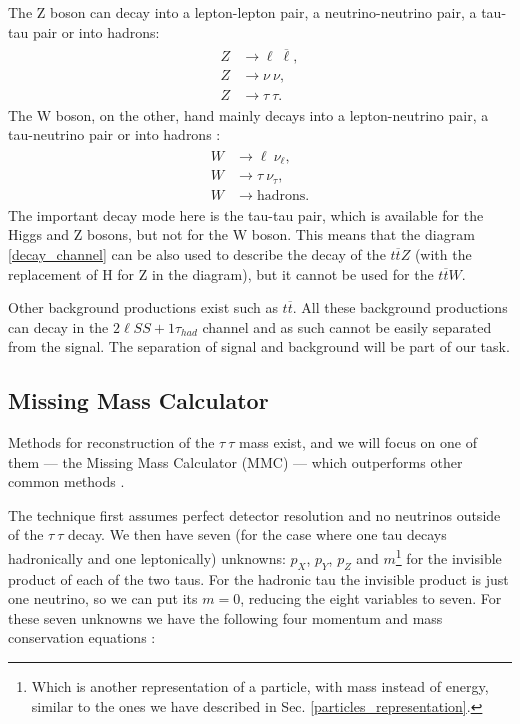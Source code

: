\documentclass{ctuthesis}
\begin{document}
The Z boson can decay into a lepton-lepton pair, a neutrino-neutrino pair, a tau-tau pair or into hadrons:
\begin{align}
\begin{split}
Z &\rightarrow \ell\: \overline{\ell}, \\
Z &\rightarrow \nu\: \nu, \\
Z &\rightarrow \tau\: \tau.
\end{split}
\end{align}
The W boson, on the other, hand mainly decays into a lepton-neutrino pair, a tau-neutrino pair or into hadrons \cite{W_Z_decay}:
\begin{align}
\begin{split}
W &\rightarrow \ell\: \nu_{\ell}, \\
W &\rightarrow \tau\: \nu_{\tau}, \\
W &\rightarrow \text{hadrons}.
\end{split}
\end{align}
The important decay mode here is the tau-tau pair, which is available for the Higgs and Z bosons, but not for the W boson. This means that the diagram \ref{decay_channel} can be also used to describe the decay of the $t\overline{t}Z$ (with the replacement of H for Z in the diagram), but it cannot be used for the $t\overline{t}W$.

Other background productions exist such as $t\overline{t}$. All these background productions can decay in the $2\ell SS + 1 \tau_{had}$ channel and as such cannot be easily separated from the signal. The separation of signal and background will be part of our task.

\subsection{Missing Mass Calculator}
\label{sec:mmc}
Methods for reconstruction of the $\tau\: \tau$ mass exist, and we will focus on one of them — the Missing Mass Calculator (MMC) — which outperforms other common methods \cite[p.18]{mmc_paper}.

The technique first assumes perfect detector resolution and no neutrinos outside of the $\tau\: \tau$ decay. We then have seven (for the case where one tau decays hadronically and one leptonically) unknowns: $p_X$, $p_Y$, $p_Z$ and $m$\footnote{Which is another representation of a particle, with mass instead of energy, similar to the ones we have described in Sec. \ref{particles_representation}.} for the invisible product of each of the two taus. For the hadronic tau the invisible product is just one neutrino, so we can put its $m=0$, reducing the eight variables to seven. For these seven unknowns we have the following four momentum and mass conservation equations \cite[p.5-6]{mmc_paper}:
\end{document}
